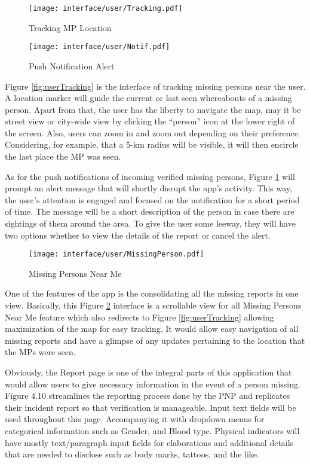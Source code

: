 \begin{figure}[!h]
    \centering
    \begin{minipage}[c]{0.50\linewidth}
        \centering
        \texttt{[image: interface/user/Tracking.pdf]}
        \caption{Tracking MP Location}
        \label{fig:userTracking}
    \end{minipage}\hfill
    \centering
    \begin{minipage}[c]{0.50\linewidth}
        \centering
        \texttt{[image: interface/user/Notif.pdf]}
        \caption{Push Notification Alert}
        \label{fig:userNotif}
    \end{minipage}
\end{figure}
Figure \ref{fig:userTracking} is the interface of tracking missing persons near the user. A location marker will guide the current or last seen whereabouts of a missing person. Apart from that, the user has the liberty to navigate the map, may it be street view or city-wide view by clicking the “person” icon at the lower right of the screen. Also, users can zoom in and zoom out depending on their preference. Considering, for example, that a 5-km radius will be visible, it will then encircle the last place the MP was seen.

As for the push notifications of incoming verified missing persons, Figure \ref{fig:userNotif} will prompt an alert message that will shortly disrupt the app’s activity. This way, the user’s attention is engaged and focused on the notification for a short period of time. The message will be a short description of the person in case there are sightings of them around the area. To give the user some leeway, they will have two options whether to view the details of the report or cancel the alert.

\begin{figure}[!h]
    \centering
    \texttt{[image: interface/user/MissingPerson.pdf]}
    \caption{Missing Persons Near Me}
    \label{fig:userMP}
\end{figure}
One of the features of the app is the consolidating all the missing reports in one view. Basically, this Figure \ref{fig:userMP} interface is a scrollable view for all Missing Persons Near Me feature which also redirects to Figure \ref{fig:userTracking} allowing maximization of the map for easy tracking. It would allow easy navigation of all missing reports and have a glimpse of any updates pertaining to the location that the MPs were seen. 

Obviously, the Report page is one of the integral parts of this application that would allow users to give necessary information in the event of a person missing. Figure 4.10 streamlines the reporting process done by the PNP and replicates their incident report so that verification is manageable. Input text fields will be used throughout this page. Accompanying it with dropdown menus for categorical information such as Gender, and Blood type. Physical indicators will have mostly text/paragraph input fields for elaborations and additional details that are needed to disclose such as body marks, tattoos, and the like.

